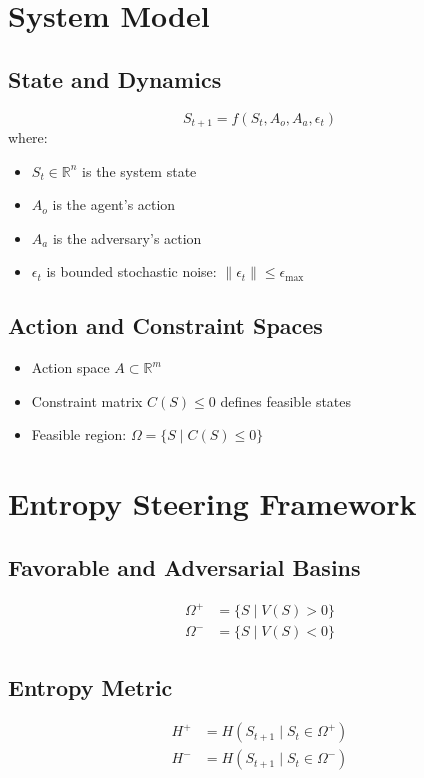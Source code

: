 \documentclass[12pt]{article}
\begin{document}
\section{System Model}

\subsection{State and Dynamics}
\begin{equation}
S_{t+1} = f(S_t, A_o, A_a, \epsilon_t)
\end{equation}
where:
\begin{itemize}
    \item $S_t \in \mathbb{R}^n$ is the system state
    \item $A_o$ is the agent's action
    \item $A_a$ is the adversary's action
    \item $\epsilon_t$ is bounded stochastic noise: $\|\epsilon_t\| \le \epsilon_{\max}$
\end{itemize}

\subsection{Action and Constraint Spaces}
\begin{itemize}
    \item Action space $A \subset \mathbb{R}^m$
    \item Constraint matrix $C(S) \le 0$ defines feasible states
    \item Feasible region: $\Omega = \{S \mid C(S) \le 0\}$
\end{itemize}

\section{Entropy Steering Framework}

\subsection{Favorable and Adversarial Basins}
\begin{align}
\Omega^+ &= \{ S \mid V(S) > 0 \} \\
\Omega^- &= \{ S \mid V(S) < 0 \}
\end{align}

\subsection{Entropy Metric}
\begin{align}
H^+ &= H(S_{t+1} \mid S_t \in \Omega^+) \\
H^- &= H(S_{t+1} \mid S_t \in \Omega^-)
\end{align}
\end{document}
